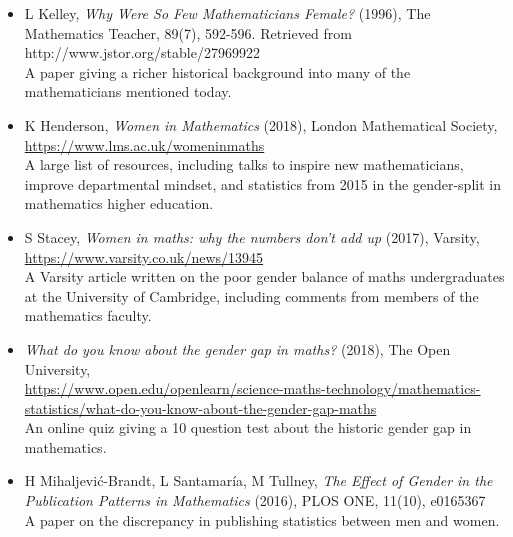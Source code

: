 \documentclass{article}
\begin{document}
\begin{itemize}
    
    \item L Kelley, \textit{Why Were So Few Mathematicians Female?} (1996), The Mathematics Teacher, 89(7), 592-596. Retrieved from http://www.jstor.org/stable/27969922 \\
    A paper giving a richer historical background into many of the mathematicians mentioned today. 
    
    
    \item K Henderson, \textit{Women in Mathematics} (2018), London Mathematical Society, \url{https://www.lms.ac.uk/womeninmaths} \\
    A large list of resources, including talks to inspire new mathematicians, improve departmental mindset, and statistics from 2015 in the gender-split in mathematics higher education.
    
    
    \item S Stacey, \textit{Women in maths: why the numbers don’t add up} (2017), Varsity, \url{https://www.varsity.co.uk/news/13945} \\
    A Varsity article written on the poor gender balance of maths undergraduates at the University of Cambridge, including comments from members of the mathematics faculty. 
    
    
    \item \textit{What do you know about the gender gap in maths?} (2018), The Open University,\\
    \url{https://www.open.edu/openlearn/science-maths-technology/mathematics-statistics/what-do-you-know-about-the-gender-gap-maths} \\
    An online quiz giving a 10 question test about the historic gender gap in mathematics. 
    
    
    \item H Mihaljević-Brandt, L Santamaría, M Tullney, \textit{The Effect of Gender in the Publication Patterns in Mathematics} (2016), PLOS ONE, 11(10), e0165367 \\
    A paper on the discrepancy in publishing statistics between men and women. 

    
\end{itemize}
\end{document}
